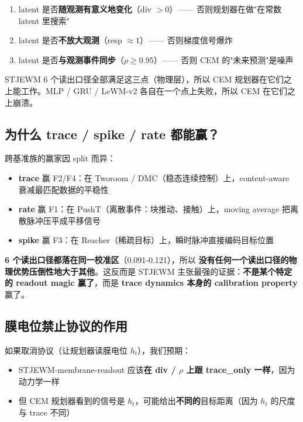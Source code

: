 \documentclass[11pt,a4paper]{article}
\begin{document}
\begin{enumerate}[leftmargin=2em]
    \item latent 是否\textbf{随观测有意义地变化}（div $> 0$）—— 否则规划器在做"在常数 latent 里搜索"
    \item latent 是否\textbf{不放大观测}（resp $\approx 1$）—— 否则梯度信号爆炸
    \item latent 是否\textbf{与观测事件同步}（$\rho \geq 0.95$）—— 否则 CEM 的"未来预测"是噪声
\end{enumerate}

STJEWM 6 个读出口径全部满足这三点（物理层），所以 CEM 规划器在它们之上能工作。MLP / GRU / LeWM-v2 各自在一个点上失败，所以 CEM 在它们之上崩溃。

\subsection{为什么 trace / spike / rate 都能赢？}

跨基准族的赢家因 split 而异：

\begin{itemize}[leftmargin=2em]
    \item \textbf{trace} 赢 F2/F4：在 Tworoom / DMC（稳态连续控制）上，content-aware 衰减最匹配数据的平稳性
    \item \textbf{rate} 赢 F1：在 PushT（离散事件：块推动、接触）上，moving average 把离散脉冲压平成平移信号
    \item \textbf{spike} 赢 F3：在 Reacher（稀疏目标）上，瞬时脉冲直接编码目标位置
\end{itemize}

\textbf{6 个读出口径都落在同一校准区}（0.091-0.121），所以 \textbf{没有任何一个读出口径的物理优势压倒性地大于其他}。这反而是 STJEWM 主张最强的证据：\textbf{不是某个特定的 readout magic 赢了}，而是 \textbf{trace dynamics 本身的 calibration property} 赢了。

\subsection{膜电位禁止协议的作用}

如果取消协议（让规划器读膜电位 $h_t$），我们预期：

\begin{itemize}[leftmargin=2em]
    \item STJEWM-membrane-readout 应该\textbf{在 div / \ensuremath{\rho} 上跟 trace\_only 一样}，因为动力学一样
    \item 但 CEM 规划器看到的信号是 $h_t$，可能给出\textbf{不同的}目标距离（因为 $h_t$ 的尺度与 trace 不同）
\end{itemize}
\end{document}
